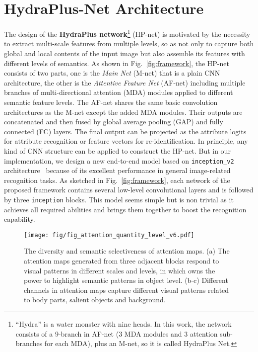 \documentclass[10pt,twocolumn,letterpaper]{article}
\begin{document}
\section{HydraPlus-Net Architecture}
\label{sec:multi_attention}
\vspace{-0.1cm}
The design of the \textbf{HydraPlus network}\footnote{“Hydra” is a water monster with nine heads. In this work, the network consists of a 9-branch in AF-net (3 MDA modules and 3 attention sub-branches for each MDA), plus an M-net, so it is called HydraPlus Net.} (HP-net) is motivated by the necessity to extract multi-scale features from multiple levels, so as not only to capture both global and local contents of the input image but also assemble its features with different levels of semantics.
As shown in Fig.~\ref{fig:framework}, the HP-net consists of two parts, one is the \textit{Main Net} (M-net) that is a plain CNN architecture, the other is the \textit{Attentive Feature Net} (AF-net) including multiple branches of multi-directional attention (MDA) modules applied to different semantic feature levels.
The AF-net shares the same basic convolution architectures as the M-net except the added MDA modules.
Their outputs are concatenated and then fused by global average pooling (GAP) and fully connected (FC) layers. The final output can be projected as the attribute logits for attribute recognition or feature vectors for re-identification.
In principle, any kind of CNN structure can be applied to construct the HP-net.
But in our implementation, we design a new end-to-end model based on \texttt{inception\_v2} architecture~\cite{ioffe2015batch} because of its excellent performance in general image-related recognition tasks.
As sketched in Fig.~\ref{fig:framework}, each network of the proposed framework contains several low-level convolutional layers and is followed by three \texttt{inception} blocks.
This model seems simple but is non trivial as it achieves all required abilities and brings them together to boost the recognition capability.



\begin{figure}[t]
\centering
\texttt{[image: fig/fig\_attention\_quantity\_level\_v6.pdf]}
\caption{The diversity and semantic selectiveness of attention maps. (a) The attention maps generated from three adjacent blocks respond to visual patterns in different scales and levels, in which  owns the power to highlight semantic patterns in object level. (b-c) Different channels in attention maps capture different visual patterns related to body parts, salient objects and background.
}
\label{fig:attention_level}
\end{figure}
\end{document}
